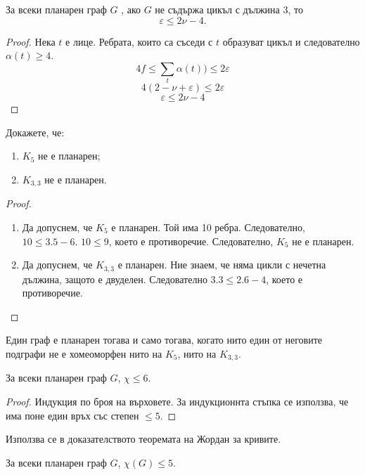 \begin{problem}
  За всеки планарен граф $G$ , ако $G$ не съдържа цикъл с дължина 3, то \[ \varepsilon \leq 2\nu - 4 .\]
\end{problem}
\begin{proof}
  Нека $t$ е лице. Ребрата, които са съседи с $t$ образуват цикъл и следователно $\alpha(t) \geq 4$.
  \[ 4f \leq \sum_{t}\alpha(t)) \leq 2\varepsilon\]
  \[4(2 - \nu + \varepsilon) \leq 2\varepsilon\]
  \[ \varepsilon \leq 2\nu - 4\]
\end{proof}



\begin{problem}
  Докажете, че:
  \begin{enumerate}
  \item
    $K_5$  не е планарен;
  \item
    $K_{3,3}$ не е планарен.
\end{enumerate}
\end{problem}
\begin{proof}
  \begin{enumerate}
  \item
    Да допуснем, че $K_5$ е планарен.
    Той има 10 ребра. Следователно,  $10 \leq 3.5 - 6$.
    $10 \leq 9$, което е противоречие.
    Следователно, $K_5$ не е планарен.
  \item
    Да допуснем, че $K_{3,3}$ е планарен.
    Ние знаем, че няма цикли с нечетна дължина, защото е двуделен.
    Следователно $ 3.3 \leq 2.6 - 4$, което е противоречие.
\end{enumerate}

\end{proof}


\begin{thm}[Куратовски]
  Един граф е планарен тогава и само тогава, когато нито един от неговите подграфи не е хомеоморфен нито на $K_5$, нито на $K_{3,3}$.
\end{thm}


\begin{thm}
  За всеки планарен граф $G$, $\chi \leq 6$.
\end{thm}
\begin{proof}
  Индукция по броя на върховете.
  За индукционнта стъпка се използва, че има поне един връх със степен $\leq 5$.
\end{proof}


Използва се в доказателството теоремата на Жордан за кривите.
\begin{thm}[Heawood]
  За всеки планарен граф $G$, $\chi(G) \leq 5$.
\end{thm}
  
